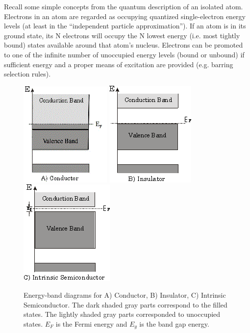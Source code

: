 \documentclass{../lab}
\begin{document}
Recall some simple concepts from the quantum description of an isolated atom. Electrons in an atom are regarded as occupying quantized single-electron energy levels (at least in the ``independent particle approximation''). If an atom is in its ground state, its N electrons will occupy the N lowest energy (i.e. most tightly bound) states available around that atom's nucleus. Electrons can be promoted to one of the infinite number of unoccupied energy levels (bound or unbound) if sufficient energy and a proper means of excitation are provided (e.g. barring selection rules).

\begin{figure}[h]
    \centering
    \href{http://experimentationlab.berkeley.edu/sites/default/files/images/SHEimage016.gif}{\includegraphics[width=0.25\linewidth,keepaspectratio]{images/SHEimage016.png}}
    \href{http://experimentationlab.berkeley.edu/sites/default/files/images/SHEimage017.gif}{\includegraphics[width=0.25\linewidth,keepaspectratio]{images/SHEimage017.png}}
    \href{http://experimentationlab.berkeley.edu/sites/default/files/images/SHEimage018.gif}{\includegraphics[width=0.25\linewidth,keepaspectratio]{images/SHEimage018.png}}
    \caption{Energy-band diagrams for A) Conductor, B) Insulator, C) Intrinsic Semiconductor. The dark shaded gray parts correspond to the filled states. The lightly shaded gray parts corresponded to unoccupied states. $E_{F}$ is the Fermi energy and $E_{g}$ is the band gap energy.}
    \label{fig:EnergyBandDiagrams}
\end{figure}
\end{document}
